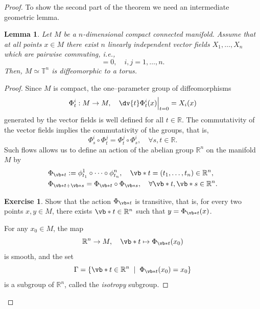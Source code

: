 \documentclass[english,fontsize=11pt,paper=b5]{scrbook}
\numberwithin{equation}{chapter}
\newtheorem{lemma}[theorem]{Lemma}
\theoremstyle{definition}
\newtheorem{exercise}{Exercise}[chapter]
\begin{document}
\begin{proof}
        To show the second part of the theorem we need an intermediate geometric lemma.
        \begin{lemma}\label{lemma:isotn}
          Let $M$ be a $n$-dimensional compact connected manifold.
          Assume that at all points $x\in M$ there exist $n$ linearly independent vector fields $X_1, \ldots, X_n$ which are pairwise commuting, i.e.,
          \begin{equation}
            [X_i, X_j] = 0, \quad i,j = 1,\ldots,n.
          \end{equation}
          Then, $M \simeq \mathbb{T}^n$ is diffeomorphic to a torus.
        \end{lemma}
        \begin{proof}
          Since $M$ is compact, the one--parameter group of diffeomorphisms
          \begin{equation}
            \Phi_t^i: M \to M, \quad \dv{t} \Phi_t^i(x)\Big|_{t=0} = X_i(x)
          \end{equation}
          generated by the vector fields is well defined for all $t\in\mathbb{R}$.
          The commutativity of the vector fields implies the commutativity of the groups, that is,
          \begin{equation}
            \Phi^i_s \circ \Phi^j_t = \Phi^j_t \circ \Phi^i_s, \quad \forall s,t\in\mathbb{R}.
          \end{equation}
          Such flows allows us to define an action of the abelian group $\mathbb{R}^n$ on the manifold $M$ by
          \begin{align}
       & \Phi_{\vb*{t}} := \phi_{t_1}^1 \circ \cdots \circ \phi_{t_n}^n, \quad \vb*{t} = (t_1, \ldots, t_n)\in \mathbb{R}^n, \\
       & \Phi_{\vb* t + \vb* s} = \Phi_{\vb* t} \circ \Phi_{\vb* s}, \quad \forall \vb* t, \vb* s \in \mathbb{R}^n.
          \end{align}

          \begin{exercise}
            Show that the action $\Phi_{\vb* t}$ is transitive, that is, for every two points $x, y\in M$, there exists $\vb* t\in\mathbb{R}^n$ such that $y = \Phi_{\vb* t} (x)$.
          \end{exercise}

          For any $x_0 \in M$, the map
          \begin{equation}\label{eq:diffeoRnM}
            \mathbb{R}^n \to M, \quad \vb* t \mapsto \Phi_{\vb* t}(x_0)
          \end{equation}
          is smooth, and the set
          \begin{equation}
            \Gamma = \left\{ \vb* t \in \mathbb{R}^n \;\mid\; \Phi_{\vb* t}(x_0) = x_0\right\}
          \end{equation}
          is a subgroup of $\mathbb{R}^n$, called the \emph{isotropy} subgroup.


\end{proof}
\end{proof}
\end{document}
